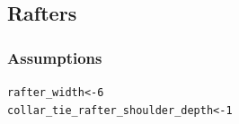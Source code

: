 \documentclass{article}\usepackage[]{graphicx}\usepackage[]{xcolor}
\makeatletter
\newcommand{\hlnum}[1]{\textcolor[rgb]{0.686,0.059,0.569}{#1}}%
\newcommand{\hlstd}[1]{\textcolor[rgb]{0.345,0.345,0.345}{#1}}%
\newcommand{\hlkwb}[1]{\textcolor[rgb]{0.69,0.353,0.396}{#1}}%
\newenvironment{kframe}{%
 \def\at@end@of@kframe{}%
 \ifinner\ifhmode%
  \def\at@end@of@kframe{\end{minipage}}%
  \begin{minipage}{\columnwidth}%
 \fi\fi%
 \def\FrameCommand##1{\hskip\@totalleftmargin \hskip-\fboxsep
 \colorbox{shadecolor}{##1}\hskip-\fboxsep
     \hskip-\linewidth \hskip-\@totalleftmargin \hskip\columnwidth}%
 \MakeFramed {\advance\hsize-\width
   \@totalleftmargin\z@ \linewidth\hsize
   \@setminipage}}%
 {\par\unskip\endMakeFramed%
 \at@end@of@kframe}
\newenvironment{knitrout}{}{} %
\makeatother
\begin{document}
\newpage
\subsection{Rafters}\label{rafter-cut-plan}

\subsubsection{Assumptions} \label{rafter-cut-plan-assumptions}

\begin{knitrout}
\color{fgcolor}\begin{kframe}
\begin{alltt}
\hlstd{rafter_width} \hlkwb{<-} \hlnum{6}
\hlstd{collar_tie_rafter_shoulder_depth} \hlkwb{<-} \hlnum{1}
\end{alltt}
\end{kframe}
\end{knitrout}

% 
\end{document}

